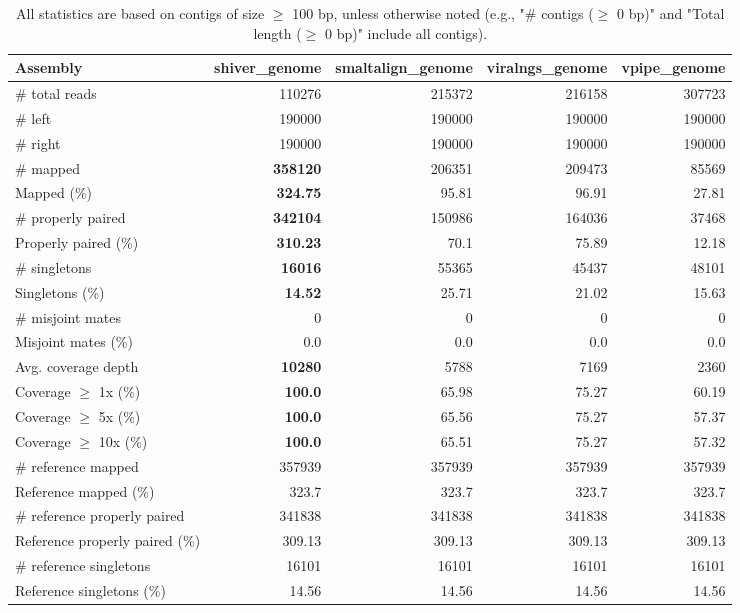 \documentclass[12pt,a4paper]{article}
\begin{document}
\begin{table}[ht]
\begin{center}
\caption{All statistics are based on contigs of size $\geq$ 100 bp, unless otherwise noted (e.g., "\# contigs ($\geq$ 0 bp)" and "Total length ($\geq$ 0 bp)" include all contigs).}
\begin{tabular}{|l*{4}{|r}|}
\hline
Assembly & shiver\_genome & smaltalign\_genome & viralngs\_genome & vpipe\_genome \\ \hline
\# total reads & 110276 & 215372 & 216158 & 307723 \\ \hline
\# left & 190000 & 190000 & 190000 & 190000 \\ \hline
\# right & 190000 & 190000 & 190000 & 190000 \\ \hline
\# mapped & {\bf 358120} & 206351 & 209473 & 85569 \\ \hline
Mapped (\%) & {\bf 324.75} & 95.81 & 96.91 & 27.81 \\ \hline
\# properly paired & {\bf 342104} & 150986 & 164036 & 37468 \\ \hline
Properly paired (\%) & {\bf 310.23} & 70.1 & 75.89 & 12.18 \\ \hline
\# singletons & {\bf 16016} & 55365 & 45437 & 48101 \\ \hline
Singletons (\%) & {\bf 14.52} & 25.71 & 21.02 & 15.63 \\ \hline
\# misjoint mates & 0 & 0 & 0 & 0 \\ \hline
Misjoint mates (\%) & 0.0 & 0.0 & 0.0 & 0.0 \\ \hline
Avg. coverage depth & {\bf 10280} & 5788 & 7169 & 2360 \\ \hline
Coverage $\geq$ 1x (\%) & {\bf 100.0} & 65.98 & 75.27 & 60.19 \\ \hline
Coverage $\geq$ 5x (\%) & {\bf 100.0} & 65.56 & 75.27 & 57.37 \\ \hline
Coverage $\geq$ 10x (\%) & {\bf 100.0} & 65.51 & 75.27 & 57.32 \\ \hline
\# reference mapped & 357939 & 357939 & 357939 & 357939 \\ \hline
Reference mapped (\%) & 323.7 & 323.7 & 323.7 & 323.7 \\ \hline
\# reference properly paired & 341838 & 341838 & 341838 & 341838 \\ \hline
Reference properly paired (\%) & 309.13 & 309.13 & 309.13 & 309.13 \\ \hline
\# reference singletons & 16101 & 16101 & 16101 & 16101 \\ \hline
Reference singletons (\%) & 14.56 & 14.56 & 14.56 & 14.56 \\ \hline

\end{tabular}
\end{center}
\end{table}
\end{document}
